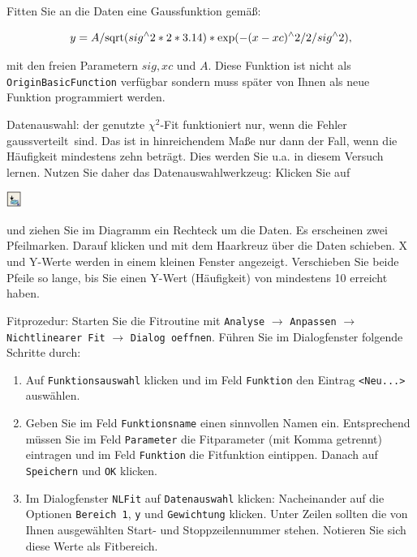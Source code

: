 \documentclass{../papanleitung}
\begin{document}
\begin{itemize}
Fitten Sie an die Daten eine Gaussfunktion gem\"{a}{\ss}:

\begin{equation}\notag
    y= A/\text{sqrt}(sig^\wedge 2*2*3.14)*\text{exp}(-(x-xc)^\wedge 2/2/sig^\wedge2),
\end{equation}

mit den freien Parametern $sig, xc$ und $A$. Diese Funktion ist nicht als \verb"OriginBasicFunction" verf\"{u}gbar sondern muss sp\"{a}ter von Ihnen als neue Funktion programmiert werden.


Datenauswahl: der genutzte $\chi^2$-Fit funktioniert nur, wenn die Fehler \glqq gaussverteilt\grqq~sind. Das ist in hinreichendem Ma{\ss}e nur dann der Fall, wenn die H\"{a}ufigkeit mindestens zehn betr\"{a}gt. Dies werden Sie u.a. in diesem Versuch lernen. Nutzen Sie daher das Datenauswahlwerkzeug: Klicken Sie auf  \begin{minipage}{5mm}
\includegraphics[height=5mm]{icon_auswahl.eps}\end{minipage} und ziehen Sie im Diagramm ein Rechteck um die Daten. Es erscheinen zwei Pfeilmarken. Darauf klicken und mit dem Haarkreuz \"{u}ber die Daten schieben. X und Y-Werte werden in einem kleinen Fenster angezeigt. Verschieben Sie beide Pfeile so lange, bis Sie einen Y-Wert (H\"{a}ufigkeit) von mindestens 10 erreicht haben.



Fitprozedur: Starten Sie die Fitroutine mit \verb"Analyse"  $\rightarrow$ \verb"Anpassen" $\rightarrow$ \verb"Nichtlinearer Fit" $\rightarrow$ \verb"Dialog oeffnen". F\"{u}hren Sie im Dialogfenster folgende Schritte durch:
\begin{enumerate}
  \item Auf \verb"Funktionsauswahl" klicken und im Feld \verb"Funktion" den Eintrag \verb"<Neu...>" ausw\"{a}hlen.
  \item Geben Sie im Feld \verb"Funktionsname" einen sinnvollen Namen ein. Entsprechend m\"{u}ssen Sie im Feld \verb"Parameter" die Fitparameter (mit Komma getrennt) eintragen und im Feld \verb"Funktion" die Fitfunktion eintippen. Danach auf \verb"Speichern" und \verb"OK"  klicken.
  \item  Im Dialogfenster \verb"NLFit"  auf \verb"Datenauswahl" klicken: Nacheinander auf die Optionen
\verb"Bereich 1", \verb"y" und \verb"Gewichtung" klicken. Unter Zeilen sollten die von Ihnen ausgew\"{a}hlten Start- und Stoppzeilennummer stehen.  Notieren Sie sich diese Werte als \glqq Fitbereich\grqq.


\end{enumerate}
\end{itemize}
\end{document}
